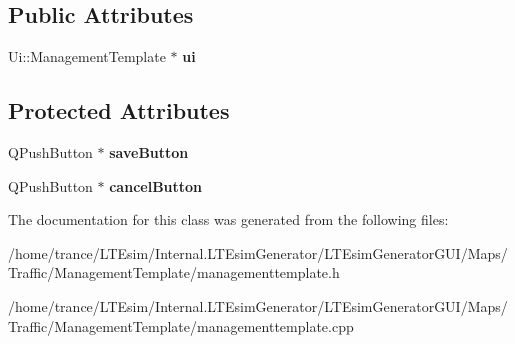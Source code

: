 \subsection*{Public Attributes}
\begin{DoxyCompactItemize}
\item 
Ui\+::\+Management\+Template $\ast$ {\bfseries ui}\hypertarget{class_management_template_a268eb55ab2663faa9f9c384836dfcc00}{}\label{class_management_template_a268eb55ab2663faa9f9c384836dfcc00}

\end{DoxyCompactItemize}
\subsection*{Protected Attributes}
\begin{DoxyCompactItemize}
\item 
Q\+Push\+Button $\ast$ {\bfseries save\+Button}\hypertarget{class_management_template_ade2765de8ddd0253d2b3bf866b4dc7d3}{}\label{class_management_template_ade2765de8ddd0253d2b3bf866b4dc7d3}

\item 
Q\+Push\+Button $\ast$ {\bfseries cancel\+Button}\hypertarget{class_management_template_a558f7f32407736630f2c79e32c231f28}{}\label{class_management_template_a558f7f32407736630f2c79e32c231f28}

\end{DoxyCompactItemize}


The documentation for this class was generated from the following files\+:\begin{DoxyCompactItemize}
\item 
/home/trance/\+L\+T\+Esim/\+Internal.\+L\+T\+Esim\+Generator/\+L\+T\+Esim\+Generator\+G\+U\+I/\+Maps/\+Traffic/\+Management\+Template/managementtemplate.\+h\item 
/home/trance/\+L\+T\+Esim/\+Internal.\+L\+T\+Esim\+Generator/\+L\+T\+Esim\+Generator\+G\+U\+I/\+Maps/\+Traffic/\+Management\+Template/managementtemplate.\+cpp\end{DoxyCompactItemize}
